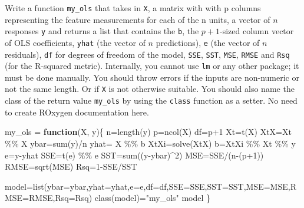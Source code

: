 \documentclass[
]{article}
\newenvironment{Shaded}{\begin{snugshade}}{\end{snugshade}}
\newcommand{\AttributeTok}[1]{\textcolor[rgb]{0.77,0.63,0.00}{#1}}
\newcommand{\ControlFlowTok}[1]{\textcolor[rgb]{0.13,0.29,0.53}{\textbf{#1}}}
\newcommand{\DecValTok}[1]{\textcolor[rgb]{0.00,0.00,0.81}{#1}}
\newcommand{\FunctionTok}[1]{\textcolor[rgb]{0.00,0.00,0.00}{#1}}
\newcommand{\NormalTok}[1]{#1}
\newcommand{\OtherTok}[1]{\textcolor[rgb]{0.56,0.35,0.01}{#1}}
\newcommand{\SpecialCharTok}[1]{\textcolor[rgb]{0.00,0.00,0.00}{#1}}
\newcommand{\StringTok}[1]{\textcolor[rgb]{0.31,0.60,0.02}{#1}}
\begin{document}
Write a function \texttt{my\_ols} that takes in \texttt{X}, a matrix
with with p columns representing the feature measurements for each of
the n units, a vector of \(n\) responses \texttt{y} and returns a list
that contains the \texttt{b}, the \(p+1\)-sized column vector of OLS
coefficients, \texttt{yhat} (the vector of \(n\) predictions),
\texttt{e} (the vector of \(n\) residuals), \texttt{df} for degrees of
freedom of the model, \texttt{SSE}, \texttt{SST}, \texttt{MSE},
\texttt{RMSE} and \texttt{Rsq} (for the R-squared metric). Internally,
you cannot use \texttt{lm} or any other package; it must be done
manually. You should throw errors if the inputs are non-numeric or not
the same length. Or if \texttt{X} is not otherwise suitable. You should
also name the class of the return value \texttt{my\_ols} by using the
\texttt{class} function as a setter. No need to create ROxygen
documentation here.

\begin{Shaded}
\begin{Highlighting}[]
\NormalTok{my\_ols }\OtherTok{=} \ControlFlowTok{function}\NormalTok{(X, y)\{}
\NormalTok{ n}\OtherTok{=}\FunctionTok{length}\NormalTok{(y)}
\NormalTok{ p}\OtherTok{=}\FunctionTok{ncol}\NormalTok{(X)}
\NormalTok{ df}\OtherTok{=}\NormalTok{p}\SpecialCharTok{+}\DecValTok{1}
\NormalTok{ Xt}\OtherTok{=}\FunctionTok{t}\NormalTok{(X)}
\NormalTok{ XtX}\OtherTok{=}\NormalTok{Xt }\SpecialCharTok{\%\%}\NormalTok{ X}
\NormalTok{ ybar}\OtherTok{=}\FunctionTok{sum}\NormalTok{(y)}\SpecialCharTok{/}\NormalTok{n}
\NormalTok{ yhat}\OtherTok{=}\NormalTok{ X }\SpecialCharTok{\%\%}\NormalTok{ b}
\NormalTok{ XtXi}\OtherTok{=}\FunctionTok{solve}\NormalTok{(XtX)}
\NormalTok{ b}\OtherTok{=}\NormalTok{XtXi }\SpecialCharTok{\%\%}\NormalTok{ Xt }\SpecialCharTok{\%\%}\NormalTok{ y}
\NormalTok{ e}\OtherTok{=}\NormalTok{y}\SpecialCharTok{{-}}\NormalTok{yhat}
\NormalTok{ SSE}\OtherTok{=}\FunctionTok{t}\NormalTok{(e) }\SpecialCharTok{\%\%}\NormalTok{ e}
\NormalTok{ SST}\OtherTok{=}\FunctionTok{sum}\NormalTok{((y}\SpecialCharTok{{-}}\NormalTok{ybar)}\SpecialCharTok{\^{}}\DecValTok{2}\NormalTok{)}
\NormalTok{ MSE}\OtherTok{=}\NormalTok{SSE}\SpecialCharTok{/}\NormalTok{(n}\SpecialCharTok{{-}}\NormalTok{(p}\SpecialCharTok{+}\DecValTok{1}\NormalTok{))}
\NormalTok{ RMSE}\OtherTok{=}\FunctionTok{sqrt}\NormalTok{(MSE)}
\NormalTok{ Rsq}\OtherTok{=}\DecValTok{1}\SpecialCharTok{{-}}\NormalTok{SSE}\SpecialCharTok{/}\NormalTok{SST}
 
\NormalTok{ model}\OtherTok{=}\FunctionTok{list}\NormalTok{(}\AttributeTok{ybar=}\NormalTok{ybar,}\AttributeTok{yhat=}\NormalTok{yhat,}\AttributeTok{e=}\NormalTok{e,}\AttributeTok{df=}\NormalTok{df,}\AttributeTok{SSE=}\NormalTok{SSE,}\AttributeTok{SST=}\NormalTok{SST,}\AttributeTok{MSE=}\NormalTok{MSE,}\AttributeTok{RMSE=}\NormalTok{RMSE,}\AttributeTok{Rsq=}\NormalTok{Rsq)}
 \FunctionTok{class}\NormalTok{(model)}\OtherTok{=}\StringTok{"my\_ols"}
\NormalTok{ model}
\NormalTok{\}}
\end{Highlighting}
\end{Shaded}
\end{document}
